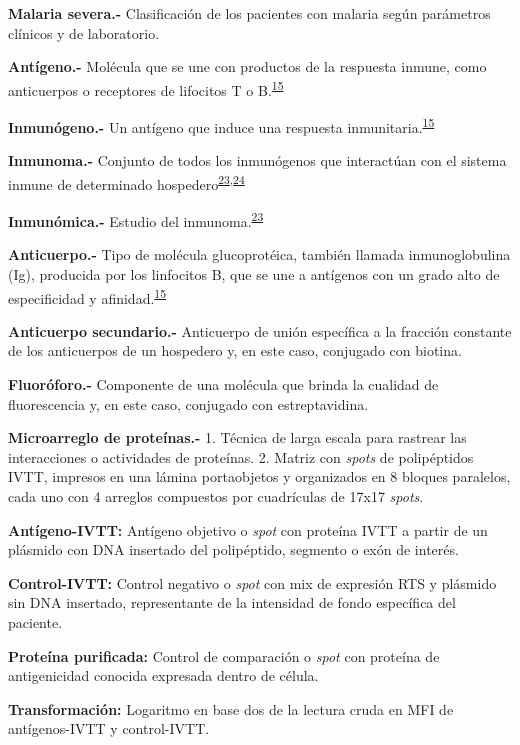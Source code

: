 \documentclass[]{article}
\begin{document}
\textbf{Malaria severa.-} Clasificación de los pacientes con malaria
según parámetros clínicos y de laboratorio.

\textbf{Antígeno.-} Molécula que se une con productos de la respuesta
inmune, como anticuerpos o receptores de lifocitos T o
B.\textsuperscript{\protect\hyperlink{ref-abbas2012}{15}}

\textbf{Inmunógeno.-} Un antígeno que induce una respuesta
inmunitaria.\textsuperscript{\protect\hyperlink{ref-abbas2012}{15}}

\textbf{Inmunoma.-} Conjunto de todos los inmunógenos que interactúan
con el sistema inmune de determinado
hospedero\textsuperscript{\protect\hyperlink{ref-immunomics2016}{23},\protect\hyperlink{ref-sette2005}{24}}

\textbf{Inmunómica.-} Estudio del
inmunoma.\textsuperscript{\protect\hyperlink{ref-immunomics2016}{23}}

\textbf{Anticuerpo.-} Tipo de molécula glucoprotéica, también llamada
inmunoglobulina (Ig), producida por los linfocitos B, que se une a
antígenos con un grado alto de especificidad y
afinidad.\textsuperscript{\protect\hyperlink{ref-abbas2012}{15}}

\textbf{Anticuerpo secundario.-} Anticuerpo de unión específica a la
fracción constante de los anticuerpos de un hospedero y, en este caso,
conjugado con biotina.

\textbf{Fluoróforo.-} Componente de una molécula que brinda la cualidad
de fluorescencia y, en este caso, conjugado con estreptavidina.

\textbf{Microarreglo de proteínas.-} 1. Técnica de larga escala para
rastrear las interacciones o actividades de proteínas. 2. Matriz con
\emph{spots} de polipéptidos IVTT, impresos en una lámina portaobjetos y
organizados en 8 bloques paralelos, cada uno con 4 arreglos compuestos
por cuadrículas de 17x17 \emph{spots}.

\textbf{Antígeno-IVTT:} Antígeno objetivo o \emph{spot} con proteína
IVTT a partir de un plásmido con DNA insertado del polipéptido, segmento
o exón de interés.

\textbf{Control-IVTT:} Control negativo o \emph{spot} con mix de
expresión RTS y plásmido sin DNA insertado, representante de la
intensidad de fondo específica del paciente.

\textbf{Proteína purificada:} Control de comparación o \emph{spot} con
proteína de antigenicidad conocida expresada dentro de célula.

\textbf{Transformación:} Logaritmo en base dos de la lectura cruda en
MFI de antígenos-IVTT y control-IVTT.
\end{document}
